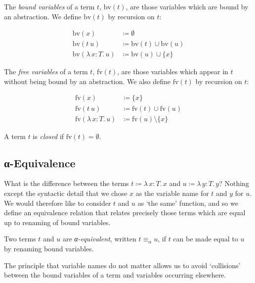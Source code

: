 \documentclass{scrartcl}
\theoremstyle{definition}
\newcommand{\bv}{\mathrm{bv}}
\newcommand{\fv}{\mathrm{fv}}
\newcommand{\Lam}[2]{λ\,#1.\, #2}
\begin{document}
\begin{definition}
  The \emph{bound variables} of a term $t$, $\bv(t)$, are those variables which are bound by an abstraction.
  We define $\bv(t)$ by recursion on $t$:

  \begin{align*}
    \bv(x) &\coloneqq ∅ \\
    \bv(t~u) &\coloneqq \bv(t) ∪ \bv(u) \\
    \bv(\Lam{x : T}{u}) &\coloneqq \bv(u) ∪ \{x\}
  \end{align*}
\end{definition}

\begin{definition}
  The \emph{free variables} of a term $t$, $\fv(t)$, are those variables which appear in $t$ without being bound by an abstraction.
  We also define $\fv(t)$ by recursion on $t$:

  \begin{align*}
    \fv(x) &\coloneqq \{x\} \\
    \fv(t~u) &\coloneqq \fv(t) ∪ \fv(u) \\
    \fv(\Lam{x : T}{u}) &\coloneqq \fv(u) \setminus \{x\}
  \end{align*}

  A term $t$ is \emph{closed} if $\fv(t) = ∅$.
\end{definition}

\subsection{α-Equivalence}

What is the difference between the terms $t ≔ \Lam{x : T}{x}$ and $u ≔ \Lam{y : T}{y}$?
Nothing except the syntactic detail that we chose $x$ as the variable name for $t$ and $y$ for $u$.
We would therefore like to consider $t$ and $u$ as \enquote*{the same} function, and so we define an equivalence relation that relates precisely those terms which are equal up to renaming of bound variables.

\begin{definition}[α-equivalence]
  Two terms $t$ and $u$ are \emph{α-equivalent}, written $t ≡_{α} u$, if $t$ can be made equal to $u$ by renaming bound variables.
\end{definition}

The principle that variable names do not matter allows us to avoid \enquote*{collisions} between the bound variables of a term and variables occurring elsewhere.
\end{document}
